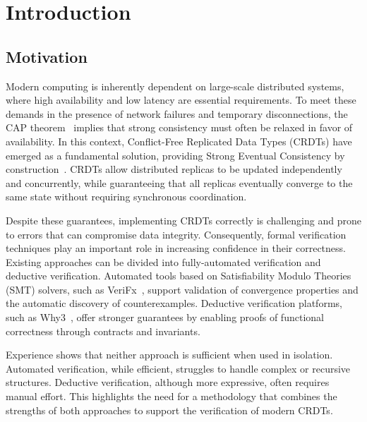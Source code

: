 
%

\chapter{Introduction}
\label{cha:introduction}

\section{Motivation}
\label{sec:motivation}

\ntindex[Motivation]{}

Modern computing is inherently dependent on large-scale distributed systems, where high availability and low latency are essential requirements. To meet these demands in the presence of network failures and temporary disconnections, the CAP theorem~\cite{cap-theorem} implies that strong consistency must often be relaxed in favor of availability. In this context, Conflict-Free Replicated Data Types (CRDTs) have emerged as a fundamental solution, providing Strong Eventual Consistency by construction~\cite{shapiro2011comprehensive}. CRDTs allow distributed replicas to be updated independently and concurrently, while guaranteeing that all replicas eventually converge to the same state without requiring synchronous coordination.

Despite these guarantees, implementing CRDTs correctly is challenging and prone to errors that can compromise data integrity. Consequently, formal verification techniques play an important role in increasing confidence in their correctness. Existing approaches can be divided into fully-automated verification and deductive verification. Automated tools based on Satisfiability Modulo Theories (SMT) solvers, such as VeriFx~\cite{porre2023masses}, support validation of convergence properties and the automatic discovery of counterexamples. Deductive verification platforms, such as Why3~\cite{why3}, offer stronger guarantees by enabling proofs of functional correctness through contracts and invariants.

Experience shows that neither approach is sufficient when used in isolation. Automated verification, while efficient, struggles to handle complex or recursive structures. Deductive verification, although more expressive, often requires manual effort. This highlights the need for a methodology that combines the strengths of both approaches to support the verification of modern CRDTs.

